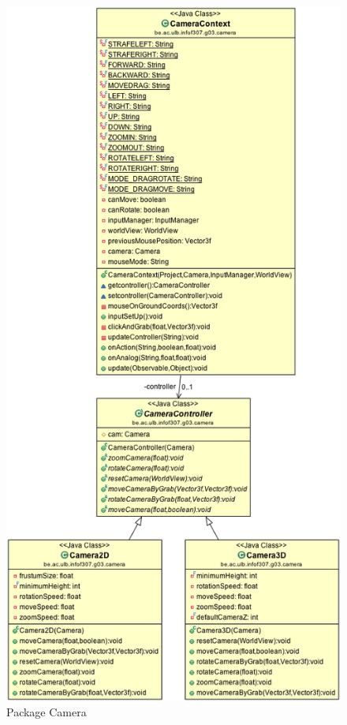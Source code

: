 	\begin{figure}
		\center
		\includegraphics[height=\textheight]{iteration4/fig/camera.png}
		\caption{Package Camera}
	\end{figure}


